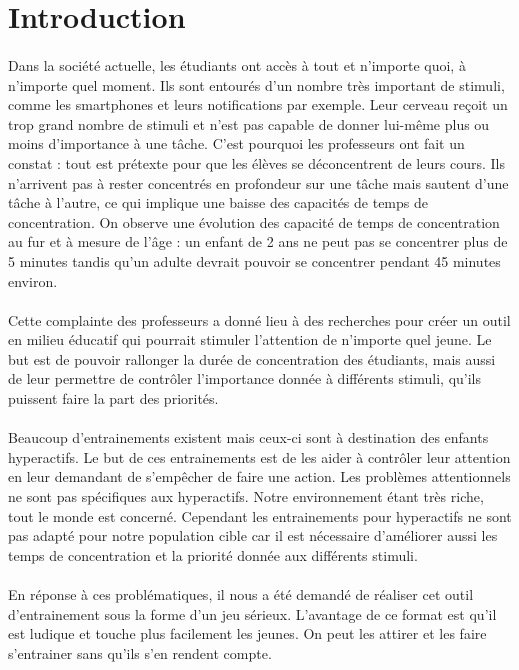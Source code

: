 \section*{Introduction}

\paragraph{}Dans la société actuelle, les étudiants ont accès à tout et n'importe quoi, à n'importe quel moment. Ils sont entourés d'un nombre très important de stimuli, comme les
smartphones et leurs notifications par exemple. Leur cerveau reçoit un trop grand nombre de stimuli et n'est pas capable de donner lui-même plus ou moins d'importance à une tâche.
C'est pourquoi les professeurs ont fait un constat : tout est prétexte pour que les élèves se déconcentrent de leurs cours. Ils n'arrivent pas à rester concentrés en profondeur sur
une tâche mais sautent d'une tâche à l'autre, ce qui implique une baisse des capacités de temps de concentration. On observe une évolution des capacité de temps de concentration au
fur et à mesure de l'âge : un enfant de 2 ans ne peut pas se concentrer plus de 5 minutes tandis qu'un adulte devrait pouvoir se concentrer pendant 45 minutes environ.

\paragraph{}Cette complainte des professeurs a donné lieu à des recherches pour créer un outil en milieu éducatif qui pourrait stimuler l'attention de n'importe quel jeune. Le but
est de pouvoir rallonger la durée de concentration des étudiants, mais aussi de leur permettre de contrôler l'importance donnée à différents stimuli, qu'ils puissent faire la part des
priorités.

\paragraph{}Beaucoup d'entrainements existent mais ceux-ci sont à destination des enfants hyperactifs. Le but de ces entrainements est de les aider à contrôler leur attention en leur
demandant de s'empêcher de faire une action. Les problèmes attentionnels ne sont pas spécifiques aux hyperactifs. Notre environnement étant très riche, tout le monde est concerné.
Cependant les entrainements pour hyperactifs ne sont pas adapté pour notre population cible car il est nécessaire d'améliorer aussi les temps de concentration et la priorité donnée
aux différents stimuli.

\paragraph{}En réponse à ces problématiques, il nous a été demandé de réaliser cet outil d'entrainement sous la forme d'un jeu sérieux. L'avantage de ce format est qu'il est ludique et
touche plus facilement les jeunes. On peut les attirer et les faire s'entrainer sans qu'ils s'en rendent compte.

\newpage